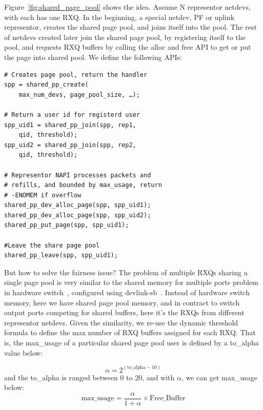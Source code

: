 \documentclass[letterpaper]{article}
\begin{document}
Figure~\ref{fig:shared_page_pool} shows the idea.
Assume N representor netdevs, with each has one RXQ. In the beginning,
a special netdev, PF or uplink representor, creates the shared page pool,
and joins itself into the pool. The rest of netdevs created later join the shared page pool,
by registering itself to the pool, and requests RXQ buffers by calling
the alloc and free API to get or put the page into shared pool.
We define the following APIs:
\begin{Verbatim}[fontsize=\small]
# Creates page pool, return the handler
spp = shared_pp_create(
    max_num_devs, page_pool_size, …);

# Return a user id for registerd user
spp_uid1 = shared_pp_join(spp, rep1,
    qid, threshold);
spp_uid2 = shared_pp_join(spp, rep2,
    qid, threshold);
    
# Representor NAPI processes packets and
# refills, and bounded by max_usage, return
# -ENOMEM if overflow
shared_pp_dev_alloc_page(spp, spp_uid1);
shared_pp_dev_alloc_page(spp, spp_uid2);
shared_pp_put_page(spp, spp_uid1);

#Leave the share page pool
shared_pp_leave(spp, spp_uid1); 
\end{Verbatim}

But how to solve the fairness issue?
The problem of multiple RXQs sharing a single page pool is
very similar to the shared memory for multiple ports problem in
hardware switch~\cite{queuelength}, configured using devlink-sb~\cite{devlinksb}.
Instead of hardware switch memory, here we have shared page pool memory,
and in contract to switch output ports competing for shared buffers,
here it's the RXQs from different representor netdevs.
Given the similarity, we re-use the dynamic threshold formula to define
the max number of RXQ buffers assigned for each RXQ. That is,
the max\_usage of a particular shared page pool user is
defined by a to\_alpha value below:

\begin{equation}
\alpha = 2^{(\text{to\_alpha} - 10)}
\end{equation}
and the to\_alpha is ranged between 0 to 20, and with $\alpha$, we can get
max\_usage below:
\begin{equation}
\text{max\_usage} = \frac{\alpha}{1 + \alpha} \times \text{Free\_Buffer}
\end{equation}
\end{document}
